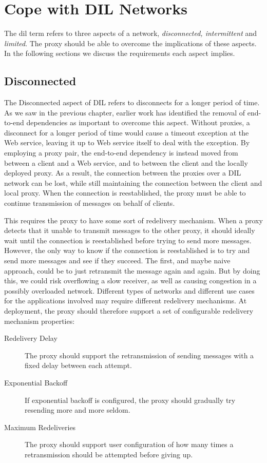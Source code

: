 \section{Cope with DIL Networks}

The \gls{dil} term refers to three aspects of a network, \textit{disconnected,
intermittent} and \textit{limited}. The proxy should be able to
overcome the implications of these aspects. In the following sections we discuss
the requirements each aspect implies.

\subsection{Disconnected}

The Disconnected aspect of DIL refers to disconnects for a longer period of
time. As we saw in the previous chapter, earlier work has identified the removal
of end-to-end dependencies as important to overcome this aspect. Without
proxies, a disconnect for a longer period of time would cause a timeout
exception at the Web service, leaving it up to Web service itself to deal with
the exception. By employing a proxy pair, the end-to-end dependency is instead
moved from between a client and a Web service, and to between the client and the
locally deployed proxy. As a result, the connection between the proxies over a
DIL network can be lost, while still maintaining the connection between the
client and local proxy. When the connection is reestablished, the proxy must be
able to continue transmission of messages on behalf of clients.

This requires the proxy to have some sort of redelivery mechanism. When a proxy
detects that it unable to transmit messages to the other proxy, it should
ideally wait until the connection is reestablished before trying to send more
messages. However, the only way to know if the connection is reestablished is to
try and send more messages and see if they succeed. The first, and maybe naive
approach, could be to just retransmit the message again and again. But by doing
this, we could risk overflowing a slow receiver, as well as causing congestion
in a possibly overloaded network. Different types of networks and different use
cases for the applications involved may require different redelivery mechanisms.
At deployment, the proxy should therefore support a  set of configurable
redelivery mechanism properties:

\begin{description}

    \item[Redelivery Delay] The proxy should support the retransmission of
    sending messages with a fixed delay between each attempt.

    \item[Exponential Backoff] If exponential backoff is configured, the proxy
    should gradually try resending more and more seldom.

    \item[Maximum Redeliveries] The proxy should support user configuration of
    how many times a retransmission should be attempted before giving up.

\end{description}


